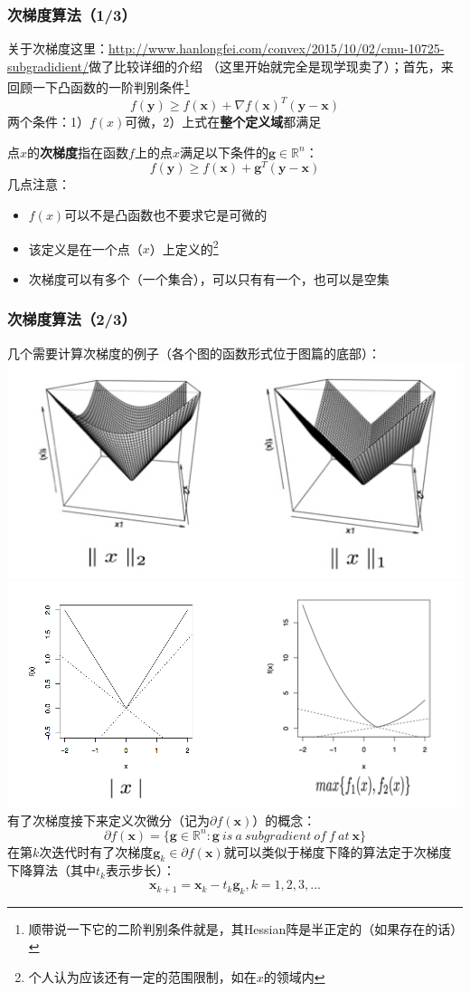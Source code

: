 \documentclass{beamer}
\begin{document}
\begin{frame}\frametitle{次梯度算法（1/3）}
\label{SubGradient_Method}
关于次梯度这里：\url{http://www.hanlongfei.com/convex/2015/10/02/cmu-10725-subgradidient/}做了比较详细的介绍
（这里开始就完全是现学现卖了）；首先，来回顾一下凸函数的一阶判别条件\footnote{顺带说一下它的二阶判别条件就是，其Hessian阵是半正定的（如果存在的话）}
\begin{displaymath}
f(\bm{y})\geq f(\bm{x})+\nabla f(\bm{x})^{T}(\bm{y}−\bm{x})
\end{displaymath}
两个条件：1）$f(x)$可微，2）上式在\textbf{整个定义域}都满足

点$x$的\textbf{次梯度}指在函数$f$上的点$x$满足以下条件的$\bm{g} \in \mathbb{R}^{n}$：
\begin{displaymath}
f(\bm{y})\geq f(\bm{x})+\bm{g}^{T}(\bm{y}−\bm{x})
\end{displaymath}
几点注意：
\begin{itemize}
\item $f(x)$可以不是凸函数也不要求它是可微的
\item 该定义是在一个点（$x$）上定义的\footnote{个人认为应该还有一定的范围限制，如在$x$的领域内}
\item 次梯度可以有多个（一个集合），可以只有有一个，也可以是空集
\end{itemize}
\end{frame}
\begin{frame}\frametitle{次梯度算法（2/3）}
几个需要计算次梯度的例子（各个图的函数形式位于图篇的底部）：\\
\includegraphics[width=0.5\linewidth]{Images/norm.jpg}
\includegraphics[width=0.5\linewidth]{Images/absolute.jpg}\\
有了次梯度接下来定义次微分（记为$\partial f(\bm{x})$）的概念：
\begin{displaymath}
\partial f(\bm{x})=\{\bm{g} \in \mathbb{R}^{n}: \bm{g}~is~a~subgradient~of~f~at~\bm{x}\}
\end{displaymath}
在第$k$次迭代时有了次梯度$\bm{g}_k \in \partial f(\bm{x})$就可以类似于梯度下降的算法定于次梯度下降算法（其中$t_k$表示步长）：
\begin{displaymath}
\bm{x}_{k+1}=\bm{x}_k-t_{k}\bm{g}_k,k=1,2,3,...
\end{displaymath}
\end{frame}
\end{document}
